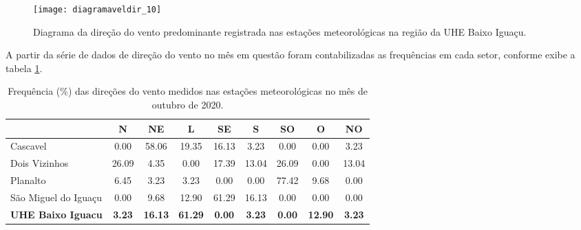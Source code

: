 \documentclass[a4paper,12pt]{article}
\begin{document}
    \begin{figure}[!htb]
    \texttt{[image: diagramaveldir\_10]}
    \caption{Diagrama da direção do vento predominante registrada nas estações meteorológicas na região da UHE Baixo Iguaçu.}
    \label{fig:figdir}
    \end{figure}
    
    A partir da série de dados de direção do vento no mês em questão foram contabilizadas as frequências em cada setor, conforme exibe a 
    tabela \ref{tab:tabdir}.

    \begin{table}[!hbt]
    \begin{center}
    \caption{Frequência (\%) das direções do vento medidos nas estações meteorológicas no mês de outubro de 2020.}
    \label{tab:tabdir}
    \begin{tabular}{lcccccccc}
    \hline
             &        N      &        NE     &        L      &        SE     &        S     &        SO     &        O    &        NO  \\
    \hline                                                                                                                            
    Cascavel       &        0.00     &        58.06     &        19.35     &        16.13     &        3.23    &        0.00     &        0.00   &        3.23   \\
    Dois Vizinhos       &        26.09     &        4.35     &        0.00     &        17.39     &        13.04    &        26.09     &        0.00   &        13.04   \\
    Planalto       &        6.45     &        3.23     &        3.23     &        0.00     &        0.00    &        77.42     &        9.68   &        0.00   \\
    São Miguel do Iguaçu       &        0.00     &        9.68     &        12.90     &        61.29     &        16.13    &        0.00     &        0.00   &        0.00   \\
    \textbf{UHE Baixo Iguacu}       &        \textbf{3.23}     &        \textbf{16.13}     &        \textbf{61.29}     &        \textbf{0.00}     &        \textbf{3.23}    &        \textbf{0.00}     &        \textbf{12.90}   &        \textbf{3.23}   \\

    \hline          
    \end{tabular}
    \end{center}
    \end{table}
\end{document}
